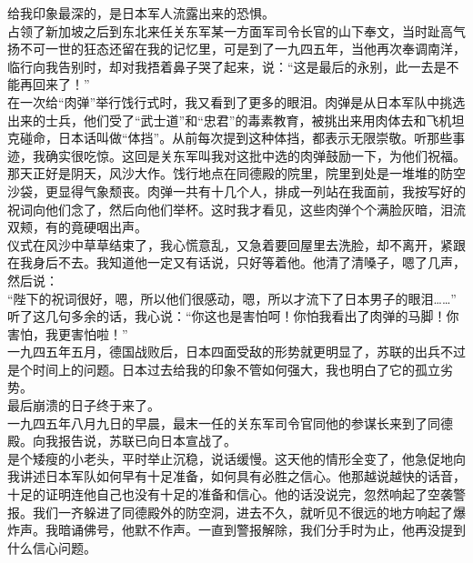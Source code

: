 给我印象最深的，是日本军人流露出来的恐惧。\\

占领了新加坡之后到东北来任关东军某一方面军司令长官的山下奉文，当时趾高气扬不可一世的狂态还留在我的记忆里，可是到了一九四五年，当他再次奉调南洋，临行向我告别时，却对我捂着鼻子哭了起来，说：“这是最后的永别，此一去是不能再回来了！”\\

在一次给“肉弹”举行饯行式时，我又看到了更多的眼泪。肉弹是从日本军队中挑选出来的士兵，他们受了“武士道”和“忠君”的毒素教育，被挑出来用肉体去和飞机坦克碰命，日本话叫做“体挡”。从前每次提到这种体挡，都表示无限崇敬。听那些事迹，我确实很吃惊。这回是关东军叫我对这批中选的肉弹鼓励一下，为他们祝福。那天正好是阴天，风沙大作。饯行地点在同德殿的院里，院里到处是一堆堆的防空沙袋，更显得气象颓丧。肉弹一共有十几个人，排成一列站在我面前，我按写好的祝词向他们念了，然后向他们举杯。这时我才看见，这些肉弹个个满脸灰暗，泪流双颊，有的竟硬咽出声。\\

仪式在风沙中草草结束了，我心慌意乱，又急着要回屋里去洗脸，却不离开，紧跟在我身后不去。我知道他一定又有话说，只好等着他。他清了清嗓子，嗯了几声，然后说：\\

“陛下的祝词很好，嗯，所以他们很感动，嗯，所以才流下了日本男子的眼泪……”\\

听了这几句多余的话，我心说：“你这也是害怕呵！你怕我看出了肉弹的马脚！你害怕，我更害怕啦！”\\

一九四五年五月，德国战败后，日本四面受敌的形势就更明显了，苏联的出兵不过是个时间上的问题。日本过去给我的印象不管如何强大，我也明白了它的孤立劣势。\\

最后崩溃的日子终于来了。\\

一九四五年八月九日的早晨，最末一任的关东军司令官同他的参谋长来到了同德殿。向我报告说，苏联已向日本宣战了。\\

是个矮瘦的小老头，平时举止沉稳，说话缓慢。这天他的情形全变了，他急促地向我讲述日本军队如何早有十足准备，如何具有必胜之信心。他那越说越快的话音，十足的证明连他自己也没有十足的准备和信心。他的话没说完，忽然响起了空袭警报。我们一齐躲进了同德殿外的防空洞，进去不久，就听见不很远的地方响起了爆炸声。我暗诵佛号，他默不作声。一直到警报解除，我们分手时为止，他再没提到什么信心问题。\\

